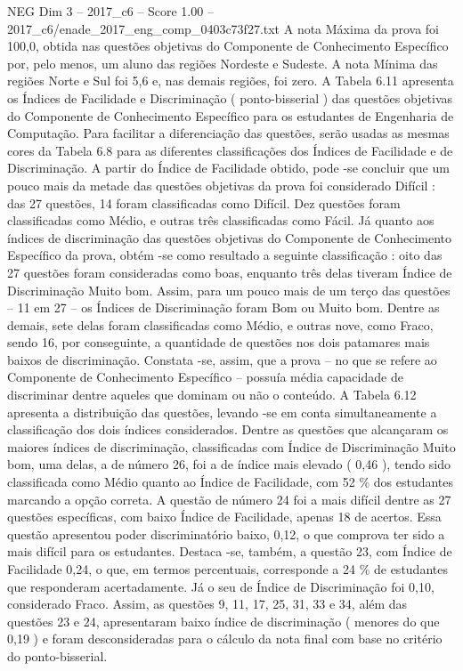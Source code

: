 \begin{textsample}{NEG Dim 3 – 2017\_c6 – Score 1.00 – 2017\_c6/enade\_2017\_eng\_comp\_0403c73f27.txt}
A nota Máxima da prova foi 100,0, obtida nas questões objetivas do Componente de Conhecimento Específico por, pelo menos, um aluno das regiões Nordeste e Sudeste.
A nota Mínima das regiões Norte e Sul foi 5,6 e, nas demais regiões, foi zero.
A Tabela 6.11 apresenta os Índices de Facilidade e Discriminação ( ponto-bisserial ) das questões objetivas do Componente de Conhecimento Específico para os estudantes de Engenharia de Computação.
Para facilitar a diferenciação das questões, serão usadas as mesmas cores da Tabela 6.8 para as diferentes classificações dos Índices de Facilidade e de Discriminação.
A partir do Índice de Facilidade obtido, pode -se concluir que um pouco mais da metade das questões objetivas da prova foi considerado Difícil : das 27 questões, 14 foram classificadas como Difícil.
Dez questões foram classificadas como Médio, e outras três classificadas como Fácil.
Já quanto aos índices de discriminação das questões objetivas do Componente de Conhecimento Específico da prova, obtém -se como resultado a seguinte classificação : oito das 27 questões foram consideradas como boas, enquanto três delas tiveram Índice de Discriminação Muito bom.
Assim, para um pouco mais de um terço das questões – 11 em 27 – os Índices de Discriminação foram Bom ou Muito bom.
Dentre as demais, sete delas foram classificadas como Médio, e outras nove, como Fraco, sendo 16, por conseguinte, a quantidade de questões nos dois patamares mais baixos de discriminação.
Constata -se, assim, que a prova – no que se refere ao Componente de Conhecimento Específico – possuía média capacidade de discriminar dentre aqueles que dominam ou não o conteúdo.
A Tabela 6.12 apresenta a distribuição das questões, levando -se em conta simultaneamente a classificação dos dois índices considerados.
Dentre as questões que alcançaram os maiores índices de discriminação, classificadas com Índice de Discriminação Muito bom, uma delas, a de número 26, foi a de índice mais elevado ( 0,46 ), tendo sido classificada como Médio quanto ao Índice de Facilidade, com 52 \% dos estudantes marcando a opção correta.
A questão de número 24 foi a mais difícil dentre as 27 questões específicas, com baixo Índice de Facilidade, apenas 18 de acertos.
Essa questão apresentou poder discriminatório baixo, 0,12, o que comprova ter sido a mais difícil para os estudantes.
Destaca -se, também, a questão 23, com Índice de Facilidade 0,24, o que, em termos percentuais, corresponde a 24 \% de estudantes que responderam acertadamente.
Já o seu de Índice de Discriminação foi 0,10, considerado Fraco.
Assim, as questões 9, 11, 17, 25, 31, 33 e 34, além das questões 23 e 24, apresentaram baixo índice de discriminação ( menores do que 0,19 ) e foram desconsideradas para o cálculo da nota final com base no critério do ponto-bisserial.

\end{textsample}
